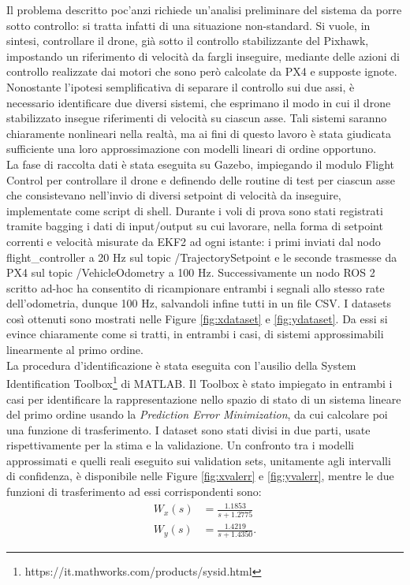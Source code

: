 \indent Il problema descritto poc'anzi richiede un'analisi preliminare del sistema da porre sotto controllo: si tratta infatti di una situazione non-standard. Si vuole, in sintesi, controllare il drone, già sotto il controllo stabilizzante del Pixhawk, impostando un riferimento di velocità da fargli inseguire, mediante delle azioni di controllo realizzate dai motori che sono però calcolate da PX4 e supposte ignote. Nonostante l'ipotesi semplificativa di separare il controllo sui due assi, è necessario identificare due diversi sistemi, che esprimano il modo in cui il drone stabilizzato insegue riferimenti di velocità su ciascun asse. Tali sistemi saranno chiaramente nonlineari nella realtà, ma ai fini di questo lavoro è stata giudicata sufficiente una loro approssimazione con modelli lineari di ordine opportuno.\\
La fase di raccolta dati è stata eseguita su Gazebo, impiegando il modulo Flight Control per controllare il drone e definendo delle routine di test per ciascun asse che consistevano nell'invio di diversi setpoint di velocità da inseguire, implementate come script di shell. Durante i voli di prova sono stati registrati tramite bagging i dati di input/output su cui lavorare, nella forma di setpoint correnti e velocità misurate da EKF2 ad ogni istante: i primi inviati dal nodo flight\_controller a 20 Hz sul topic /TrajectorySetpoint e le seconde trasmesse da PX4 sul topic /VehicleOdometry a 100 Hz. Successivamente un nodo ROS 2 scritto ad-hoc ha consentito di ricampionare entrambi i segnali allo stesso rate dell'odometria, dunque 100 Hz, salvandoli infine tutti in un file CSV. I datasets così ottenuti sono mostrati nelle Figure \ref{fig:xdataset} e \ref{fig:ydataset}. Da essi si evince chiaramente come si tratti, in entrambi i casi, di sistemi approssimabili linearmente al primo ordine.\\
La procedura d'identificazione è stata eseguita con l'ausilio della System Identification Toolbox\footnote{https://it.mathworks.com/products/sysid.html} di MATLAB. Il Toolbox è stato impiegato in entrambi i casi per identificare la rappresentazione nello spazio di stato di un sistema lineare del primo ordine usando la \emph{Prediction Error Minimization}, da cui calcolare poi una funzione di trasferimento. I dataset sono stati divisi in due parti, usate rispettivamente per la stima e la validazione. Un confronto tra i modelli approssimati e quelli reali eseguito sui validation sets, unitamente agli intervalli di confidenza, è disponibile nelle Figure \ref{fig:xvalerr} e \ref{fig:yvalerr}, mentre le due funzioni di trasferimento ad essi corrispondenti sono:
\begin{subequations}
    \begin{align}
        W_x(s) &= \frac{1.1853}{s+1.2775}\\
        W_y(s) &= \frac{1.4219}{s+1.4350}.
    \end{align}
\end{subequations}

